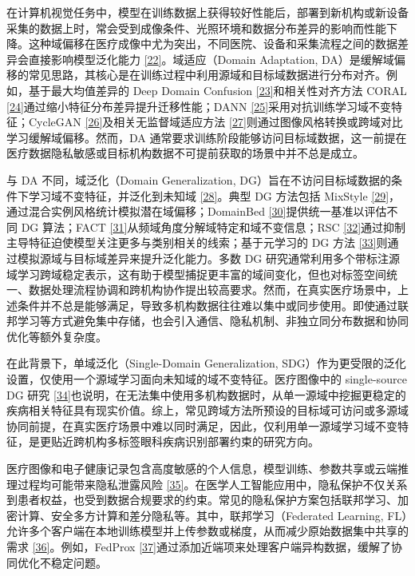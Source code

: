 在计算机视觉任务中，模型在训练数据上获得较好性能后，部署到新机构或新设备采集的数据上时，常会受到成像条件、光照环境和数据分布差异的影响而性能下降。这种域偏移在医疗成像中尤为突出，不同医院、设备和采集流程之间的数据差异会直接影响模型泛化能力 \hyperref[_Ref213949439]{{[}22{]}}。域适应（Domain Adaptation, DA）是缓解域偏移的常见思路，其核心是在训练过程中利用源域和目标域数据进行分布对齐。例如，基于最大均值差异的 Deep Domain Confusion \hyperref[_Ref213949448]{{[}23{]}}和相关性对齐方法 CORAL \hyperref[_Ref213949453]{{[}24{]}}通过缩小特征分布差异提升迁移性能；DANN \hyperref[_Ref213949479]{{[}25{]}}采用对抗训练学习域不变特征；CycleGAN \hyperref[_Ref213949490]{{[}26{]}}及相关无监督域适应方法 \hyperref[_Ref213949530]{{[}27{]}}则通过图像风格转换或跨域对比学习缓解域偏移。然而，DA 通常要求训练阶段能够访问目标域数据，这一前提在医疗数据隐私敏感或目标机构数据不可提前获取的场景中并不总是成立。

与 DA 不同，域泛化（Domain Generalization, DG）旨在不访问目标域数据的条件下学习域不变特征，并泛化到未知域 \hyperref[_Ref213949554]{{[}28{]}}。典型 DG 方法包括 MixStyle \hyperref[_Ref213949562]{{[}29{]}}，通过混合实例风格统计模拟潜在域偏移；DomainBed \hyperref[_Ref213949607]{{[}30{]}}提供统一基准以评估不同 DG 算法；FACT \hyperref[_Ref213949788]{{[}31{]}}从频域角度分解域特定和域不变信息；RSC \hyperref[_Ref213949796]{{[}32{]}}通过抑制主导特征迫使模型关注更多与类别相关的线索；基于元学习的 DG 方法 \hyperref[_Ref213949803]{{[}33{]}}则通过模拟源域与目标域差异来提升泛化能力。多数 DG 研究通常利用多个带标注源域学习跨域稳定表示，这有助于模型捕捉更丰富的域间变化，但也对标签空间统一、数据处理流程协调和跨机构协作提出较高要求。然而，在真实医疗场景中，上述条件并不总是能够满足，导致多机构数据往往难以集中或同步使用。即使通过联邦学习等方式避免集中存储，也会引入通信、隐私机制、非独立同分布数据和协同优化等额外复杂度。

在此背景下，单域泛化（Single-Domain Generalization, SDG）作为更受限的泛化设置，仅使用一个源域学习面向未知域的域不变特征。医疗图像中的 single-source DG 研究 \hyperref[_Ref213949863]{{[}34{]}}也说明，在无法集中使用多机构数据时，从单一源域中挖掘更稳定的疾病相关特征具有现实价值。综上，常见跨域方法所预设的目标域可访问或多源域协同前提，在真实医疗场景中难以同时满足，因此，仅利用单一源域学习域不变特征，是更贴近跨机构多标签眼科疾病识别部署约束的研究方向。

\label{c.ux9690ux79c1ux4fddux62a4}

医疗图像和电子健康记录包含高度敏感的个人信息，模型训练、参数共享或云端推理过程均可能带来隐私泄露风险 \hyperref[_Ref213950358]{{[}35{]}}。在医学人工智能应用中，隐私保护不仅关系到患者权益，也受到数据合规要求的约束。常见的隐私保护方案包括联邦学习、加密计算、安全多方计算和差分隐私等。其中，联邦学习（Federated Learning, FL）允许多个客户端在本地训练模型并上传参数或梯度，从而减少原始数据集中共享的需求 \hyperref[_Ref213950376]{{[}36{]}}。例如，FedProx \hyperref[_Ref213950391]{{[}37{]}}通过添加近端项来处理客户端异构数据，缓解了协同优化不稳定问题。

